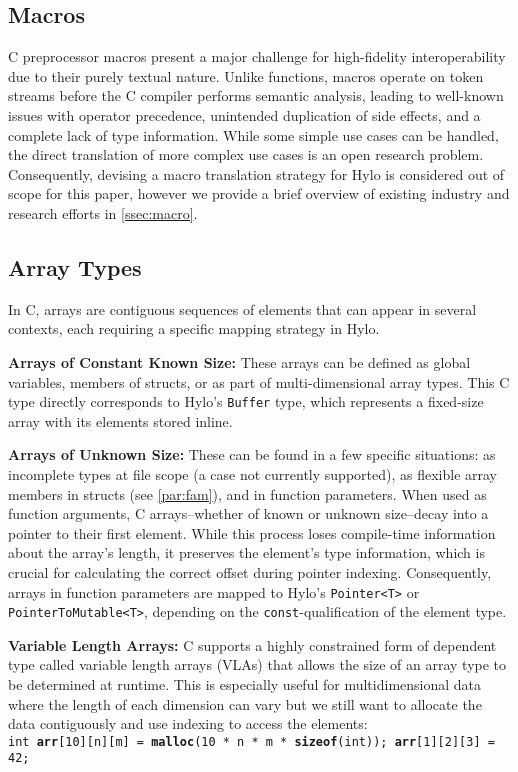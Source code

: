 \subsection{Macros}
C preprocessor macros present a major challenge for high-fidelity interoperability due to their purely textual nature.  Unlike functions, macros operate on token streams before the C compiler performs semantic analysis, leading to well-known issues with operator precedence, unintended duplication of side effects, and a complete lack of type information.  While some simple use cases can be handled, the direct translation of more complex use cases is an open research problem. Consequently, devising a macro translation strategy for Hylo is considered out of scope for this paper, however we provide a brief overview of existing industry and research efforts in \autoref{ssec:macro}.

\subsection{Array Types}
In C, arrays are contiguous sequences of elements that can appear in several contexts\cite{carrays}, each requiring a specific mapping strategy in Hylo.

\textbf{Arrays of Constant Known Size:} These arrays can be defined as global variables, members of structs, or as part of multi-dimensional array types. This C type directly corresponds to Hylo's \texttt{Buffer} type, which represents a fixed-size array with its elements stored inline.

\textbf{Arrays of Unknown Size:} These can be found in a few specific situations: as incomplete types at file scope (a case not currently supported), as flexible array members in structs (see \autoref{par:fam}), and in function parameters. When used as function arguments, C arrays--whether of known or unknown size--decay into a pointer to their first element. While this process loses compile-time information about the array's length, it preserves the element's type information, which is crucial for calculating the correct offset during pointer indexing. Consequently, arrays in function parameters are mapped to Hylo's \texttt{Pointer<T>} or \texttt{PointerToMutable<T>}, depending on the \texttt{const}-qualification of the element type.

\textbf{Variable Length Arrays:}
C supports a highly constrained form of dependent type called variable length arrays (VLAs) that allows the size of an array type to be determined at runtime. This is especially useful for multidimensional data\cite{vla-reddit} where the length of each dimension can vary but we still want to allocate the data contiguously and use indexing to access the elements: \\
\texttt{int \textbf{arr}[10][n][m] = \textbf{malloc}(10 * n * m * \textbf{sizeof}(int)); \space\space\space   \textbf{arr}[1][2][3] = 42;}

